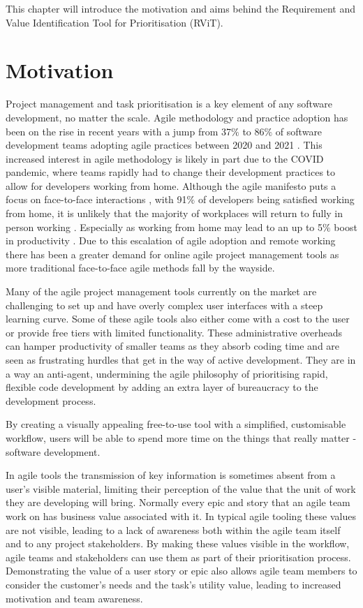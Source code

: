 \documentclass[l4proj.tex]{subfiles}
\begin{document}
  

This chapter will introduce the motivation and aims behind the Requirement and Value Identification Tool for Prioritisation (RViT).

\section{Motivation}

Project management and task prioritisation is a key element of any software development, no matter the scale. Agile methodology and practice adoption has been on the rise in recent years with a jump from 37$\%$ to 86$\%$ of software development teams adopting agile practices between 2020 and 2021 \cite{Knaster2023}. This increased interest in agile methodology is likely in part due to the COVID pandemic, where teams rapidly had to change their development practices to allow for developers working from home.   Although the agile manifesto puts a focus on face-to-face interactions \cite{Kent2001}, with 91$\%$ of developers being satisfied working from home, it is unlikely that the majority of workplaces will return to fully in person working \cite{Ramírez2022}. Especially as working from home may lead to an up to 5$\%$ boost in productivity \cite{Barrero2021}. Due to this escalation of agile adoption and remote working there has been a greater demand for online agile project management tools as more traditional face-to-face agile methods fall by the wayside.

Many of the agile project management tools currently on the market are challenging to set up and have overly complex user interfaces with a steep learning curve. Some of these agile tools also either come with a cost to the user or provide free tiers with limited functionality. These administrative overheads can hamper productivity of smaller teams as they absorb coding time and are seen as frustrating hurdles that get in the way of active development. They are in a way an anti-agent, undermining the agile philosophy of prioritising rapid, flexible code development by adding an extra layer of bureaucracy to the development process.

By creating a visually appealing free-to-use tool with a simplified, customisable workflow, users will be able to spend more time on the things that really matter - software development.

In agile tools the transmission of key information is sometimes absent from a user's visible material, limiting their perception of the value that the unit of work they are developing will bring. Normally every epic and story that an agile team work on has business value associated with it. In typical agile tooling these values are not visible, leading to a lack of awareness both within the agile team itself and to any project stakeholders. By making these values visible in the workflow, agile teams and stakeholders can use them as part of their prioritisation process. Demonstrating the value of a user story or epic also allows agile team members to consider the customer's needs and the task's utility value, leading to increased motivation and team awareness.
\end{document}
